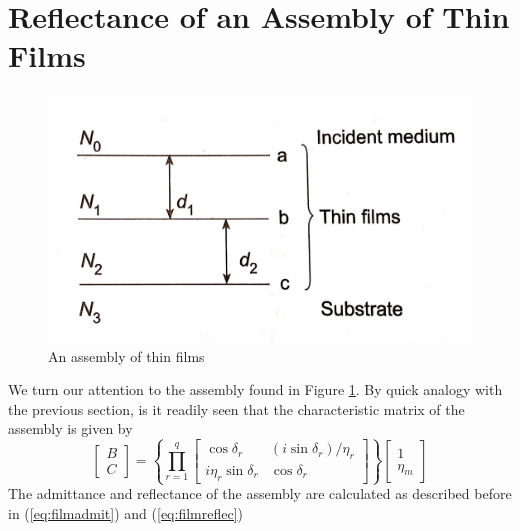 \documentclass{article}
\begin{document}
\section{Reflectance of an Assembly of Thin Films}
    \begin{figure}
        \includegraphics[width=\linewidth]{film_assembly.png}
        \caption{An assembly of thin films}
        \label{fig:assem}
    \end{figure}
    We turn our attention to the assembly found in Figure \ref{fig:assem}. By quick analogy with the previous section, is it readily seen that the characteristic matrix of the assembly is given by
    \begin{equation}
        \begin{bmatrix}
            B \\
            C
        \end{bmatrix}
        =
        \left\{\prod_{r=1}^q
        \begin{bmatrix}
            \cos \delta_r & (i \sin \delta_r)/\eta_r \\
            i \eta_r \sin \delta_r & \cos \delta_r            
        \end{bmatrix}
        \right\}
        \begin{bmatrix}
            1 \\
            \eta_m            
        \end{bmatrix}
    \end{equation}
    The admittance and reflectance of the assembly are calculated as described before in (\ref{eq:filmadmit}) and (\ref{eq:filmreflec})
\end{document}
